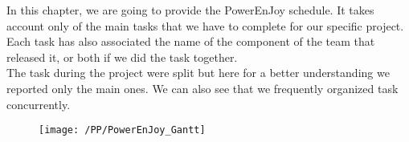 In this chapter, we are going to provide the PowerEnJoy schedule. It takes account only of the main tasks that we have to complete for our specific project. Each task has also associated the name of the component of the team that released it, or both if we did the task together. 
\\The task during the project were split but here for a better understanding we reported only the main ones. We can also see that we frequently organized task concurrently.

\begin{center}
\begin{figure}[!ht]
  \centering
  \vspace{0.2cm}
  \texttt{[image: /PP/PowerEnJoy\_Gantt]}\\
  \vspace{0.2cm}
  \label{fig:login_mockup} 
\end{figure}
\end{center}


